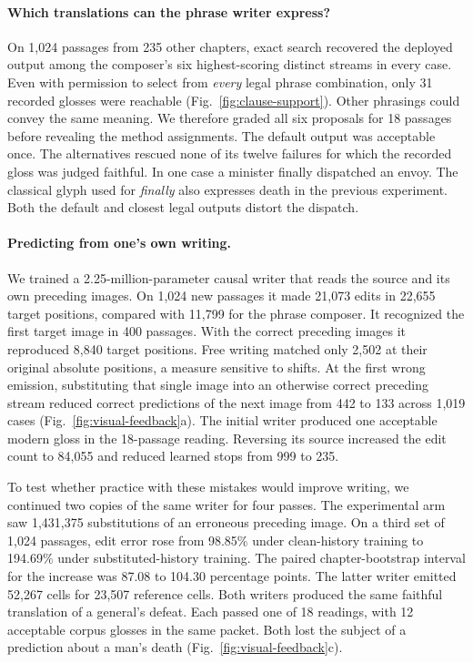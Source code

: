 \documentclass[12pt,a4paper]{article}
\providecommand{\DIFadd}[1]{{\protect\color{blue} \sf #1}} %
\begin{document}
\paragraph{\DIFadd{Which translations can the phrase writer express?}}
\DIFadd{On 1,024 passages from 235 other chapters, exact search recovered the deployed output among the composer's six highest-scoring distinct streams in every case. Even with permission to select from \emph{every} legal phrase combination, only 31 recorded glosses were reachable (Fig.~\ref{fig:clause-support}). Other phrasings could convey the same meaning. We therefore graded all six proposals for 18 passages before revealing the method assignments. The default output was acceptable once. The alternatives rescued none of its twelve failures for which the recorded gloss was judged faithful. In one case a minister finally dispatched an envoy. The classical glyph used for \emph{finally} also expresses death in the previous experiment. Both the default and closest legal outputs distort the dispatch.
}

\paragraph{\DIFadd{Predicting from one's own writing.}}
\DIFadd{We trained a 2.25-million-parameter causal writer that reads the source and its own preceding images. On 1,024 new passages it made 21,073 edits in 22,655 target positions, compared with 11,799 for the phrase composer. It recognized the first target image in 400 passages. With the correct preceding images it reproduced 8,840 target positions. Free writing matched only 2,502 at their original absolute positions, a measure sensitive to shifts. At the first wrong emission, substituting that single image into an otherwise correct preceding stream reduced correct predictions of the next image from 442 to 133 across 1,019 cases (Fig.~\ref{fig:visual-feedback}a). The initial writer produced one acceptable modern gloss in the 18-passage reading. Reversing its source increased the edit count to 84,055 and reduced learned stops from 999 to 235.
}

\DIFadd{To test whether practice with these mistakes would improve writing, we continued two copies of the same writer for four passes. The experimental arm saw 1,431,375 substitutions of an erroneous preceding image. On a third set of 1,024 passages, edit error rose from 98.85\% under clean-history training to 194.69\% under substituted-history training. The paired chapter-bootstrap interval for the increase was 87.08 to 104.30 percentage points. The latter writer emitted 52,267 cells for 23,507 reference cells. Both writers produced the same faithful translation of a general's defeat. Each passed one of 18 readings, with 12 acceptable corpus glosses in the same packet. Both lost the subject of a prediction about a man's death (Fig.~\ref{fig:visual-feedback}c).
}
\end{document}
